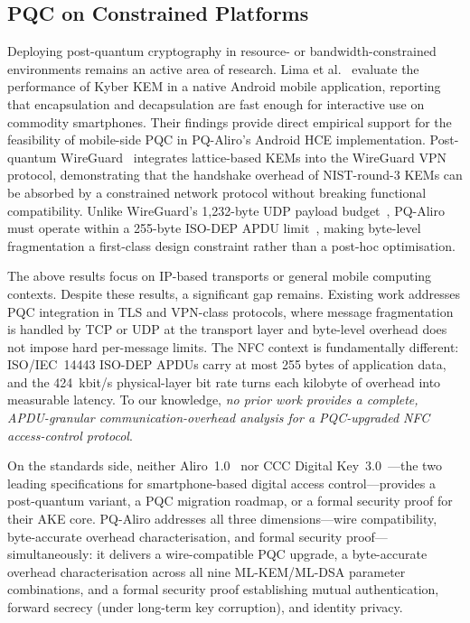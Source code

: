 \documentclass[runningheads]{llncs}
\begin{document}
\subsection{PQC on Constrained Platforms}
\label{sec:related:constrained}

Deploying post-quantum cryptography in resource- or bandwidth-constrained
environments remains an active area of research.
Lima et al.~\cite{NIST3PQC:Lima21} evaluate the performance of Kyber KEM in a
native Android mobile application, reporting that encapsulation and
decapsulation are fast enough for interactive use on commodity smartphones.
Their findings provide direct empirical support for the feasibility of
mobile-side PQC in PQ-Aliro's Android HCE implementation.
Post-quantum WireGuard~\cite{SP:HNSWZ21} integrates lattice-based KEMs into the
WireGuard VPN protocol, demonstrating that the handshake overhead of
NIST-round-3 KEMs can be absorbed by a constrained network protocol without
breaking functional compatibility.
Unlike WireGuard's 1{,}232-byte UDP payload budget~\cite{SP:HNSWZ21}, PQ-Aliro must operate within a 255-byte ISO-DEP APDU limit~\cite{ISOIEC14443}, making byte-level fragmentation a first-class design constraint rather than a post-hoc optimisation.

The above results focus on IP-based transports or general mobile computing
contexts.
Despite these results, a significant gap remains.
Existing work addresses PQC integration in TLS and VPN-class protocols, where
message fragmentation is handled by TCP or UDP at the transport layer and
byte-level overhead does not impose hard per-message limits.
The NFC context is fundamentally different: ISO/IEC~14443 ISO-DEP APDUs carry
at most 255 bytes of application data, and the 424~kbit/s physical-layer
bit rate turns each kilobyte of overhead into measurable latency.
To our knowledge, \emph{no prior work provides a complete, APDU-granular
communication-overhead analysis for a PQC-upgraded NFC access-control
protocol}.

{\sloppy
On the standards side, neither Aliro~1.0~\cite{CSA:Aliro10} nor CCC Digital
Key~3.0~\cite{CCC:DigKey3}---the two leading specifications for smartphone-\allowbreak based
digital access control---provides a post-quantum variant, a PQC migration
roadmap, or a formal security proof for their AKE core.
PQ-Aliro addresses all three dimensions---wire compatibility, byte-accurate
overhead characterisation, and formal security proof---simultaneously: it
delivers a wire-compatible PQC upgrade, a byte-accurate overhead
characterisation across all nine ML-KEM/ML-DSA parameter combinations, and a
formal security proof establishing mutual authentication, forward secrecy (under long-term key corruption), and identity privacy.
\par}
\end{document}
